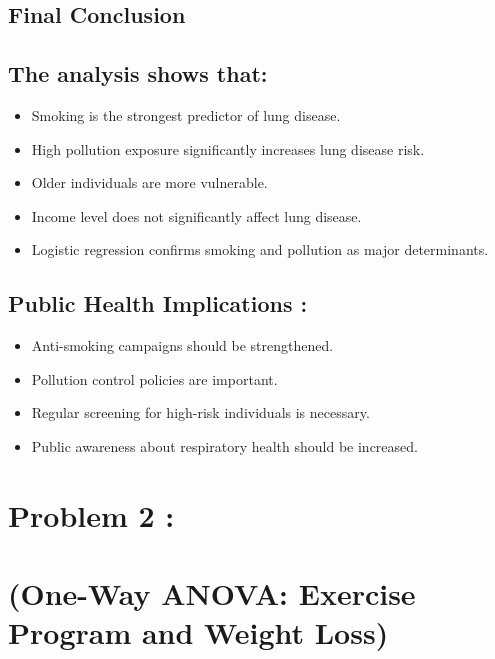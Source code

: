 \documentclass[
]{article}
\begin{document}
\subsection{Final Conclusion}\label{final-conclusion}

\subsection{The analysis shows that:}\label{the-analysis-shows-that}

\begin{itemize}
\item
  Smoking is the strongest predictor of lung disease.
\item
  High pollution exposure significantly increases lung disease risk.
\item
  Older individuals are more vulnerable.
\item
  Income level does not significantly affect lung disease.
\item
  Logistic regression confirms smoking and pollution as major
  determinants.
\end{itemize}

\subsection{Public Health Implications
:}\label{public-health-implications}

\begin{itemize}
\item
  Anti-smoking campaigns should be strengthened.
\item
  Pollution control policies are important.
\item
  Regular screening for high-risk individuals is necessary.
\item
  Public awareness about respiratory health should be increased.
\end{itemize}

\section{}\label{section}

\section{\texorpdfstring{\textbf{Problem 2
:}}{Problem 2 :}}\label{problem-2}

\section{(One-Way ANOVA: Exercise Program and Weight
Loss)}\label{one-way-anova-exercise-program-and-weight-loss}
\end{document}
